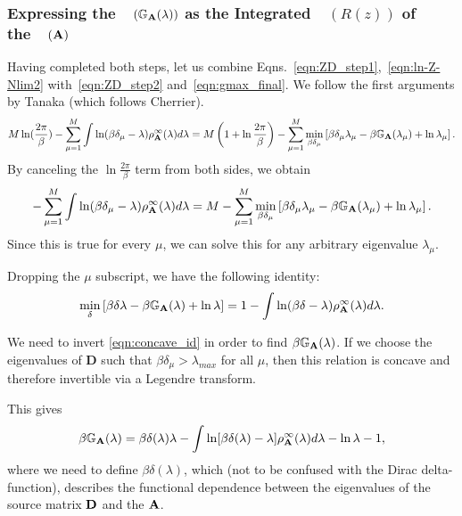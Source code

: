 \subsubsection{Expressing the~\GEN~$(\mathbb{G}_{\mathbf{A}}(\lambda))$ as the Integrated~\RTransform~$(R(z))$ of the~\CorrelationMatrix~$(\mathbf{A})$}
\label{sxn:tanaka_end}
Having completed both steps, let us combine Eqns.~\ref{eqn:ZD_step1},~\ref{eqn:ln-Z-Nlim2}
with~\ref{eqn:ZD_step2} and~\ref{eqn:gmax_final}.
We follow the first arguments by Tanaka\cite{Tanaka2007} (which follows Cherrier\cite{Cherrier2003}).
\begin{align}
   M\ln(\dfrac{{2}\pi}{\beta})-\sum_{\mu=1}^{M}\int \ln(\beta\delta_{\mu}-\lambda)\rho^{\infty}_{\mathbf{A}}(\lambda)d\lambda
      = M \left( 1 + \ln \frac{2\pi}{\beta} \right) - \sum_{\mu=1}^{M} \min_{\beta\delta_{\mu}} \left[\beta\delta_{\mu}\lambda_{\mu}
      - \beta\mathbb{G}_{\mathbf{A}}(\lambda_{\mu}) + \ln \lambda_{\mu} \right]   .
\end{align}
By canceling the $\ln \frac{2\pi}{\beta}$ term from both sides, we obtain
\begin{align}
   -\sum_{\mu=1}^{M}\int \ln(\beta\delta_{\mu}-\lambda)\rho^{\infty}_{\mathbf{A}}(\lambda)d\lambda
   =
   M - \sum_{\mu=1}^{M} \min_{\beta\delta_{\mu}} \left[\beta\delta_{\mu}\lambda_{\mu}
   - \beta\mathbb{G}_{\mathbf{A}}(\lambda_{\mu}) + \ln \lambda_{\mu} \right]   .
\end{align}
Since this is true for every $\mu$, we can solve this for any arbitrary eigenvalue $\lambda_{\mu}$.

Dropping the $\mu$ subscript, we have the following identity:
\begin{align}
\label{eqn:concave_id} 
 \min_{\delta} \left[\beta\delta\lambda - \beta\mathbb{G}_{\mathbf{A}}(\lambda) + \ln \lambda \right]
 = 1 -\int \ln(\beta\delta-\lambda)\rho^{\infty}_{\mathbf{A}}(\lambda)d\lambda   .
\end{align}

We need to invert \ref{eqn:concave_id} in order to find $\beta\mathbb{G}_{\mathbf{A}}(\lambda)$.
If we choose the eigenvalues of $\mathbf{D}$ such that $\beta\delta_{\mu}>\lambda_{max}$ for all $\mu$, then 
this relation is concave and therefore invertible via a Legendre transform.  

This gives
\begin{equation}
\beta\mathbb{G}_{\mathbf{A}}(\lambda) = \beta\delta(\lambda) \lambda - \int \ln[\beta\delta(\lambda) - \lambda] \rho^{\infty}_{\mathbf{A}}(\lambda) d\lambda - \ln \lambda - 1  ,
\end{equation}
where we need to  define  $ \beta\delta(\lambda)$, which (not to be confused with the Dirac delta-function), describes
the functional dependence between the eigenvalues of the source matrix $\mathbf{D}$ and the \Student \CorrelationMatrix $\mathbf{A}$.

